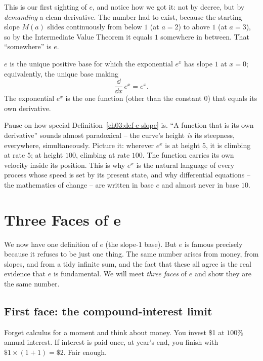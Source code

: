 This is our first sighting of $e$, and notice how we got it: not by decree, but by \emph{demanding} a clean derivative. The number had to exist, because the starting slope $M(a)$ slides continuously from below $1$ (at $a=2$) to above $1$ (at $a=3$), so by the Intermediate Value Theorem it equals $1$ somewhere in between. That ``somewhere'' is $e$.

\begin{definition}\label{ch03:def-e-slope}
$e$ is the unique positive base for which the exponential $e^x$ has slope $1$ at $x=0$; equivalently, the unique base making
\[
\frac{\dd}{\dd x}\,e^{x} = e^{x}.
\]
The exponential $e^x$ is the one function (other than the constant $0$) that equals its own derivative.
\end{definition}

\begin{aestheticbox}
Pause on how special Definition~\ref{ch03:def-e-slope} is. ``A function that is its own derivative'' sounds almost paradoxical -- the curve's height \emph{is} its steepness, everywhere, simultaneously. Picture it: wherever $e^x$ is at height $5$, it is climbing at rate $5$; at height $100$, climbing at rate $100$. The function carries its own velocity inside its position. This is why $e^x$ is the natural language of every process whose speed is set by its present state, and why differential equations -- the mathematics of change -- are written in base $e$ and almost never in base $10$.
\end{aestheticbox}

\section{Three Faces of e}

We now have one definition of $e$ (the slope-$1$ base). But $e$ is famous precisely because it refuses to be just one thing. The same number arises from money, from slopes, and from a tidy infinite sum, and the fact that these all agree is the real evidence that $e$ is fundamental. We will meet \emph{three faces} of $e$ and show they are the same number.

\subsection{First face: the compound-interest limit}

Forget calculus for a moment and think about money. You invest \$1 at $100\%$ annual interest. If interest is paid once, at year's end, you finish with $\$1\times(1+1)=\$2$. Fair enough.

